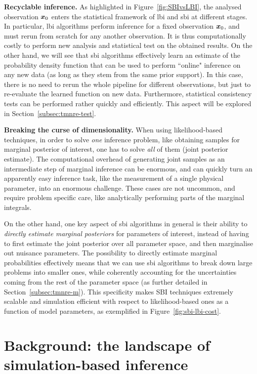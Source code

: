 \noindent \textbf{Recyclable inference.} As highlighted in Figure~\ref{fig:SBIvsLBI}, the analysed observation $\bm{x}_0$ enters the statistical framework of \gls*{lbi} and \gls*{sbi} at different stages. In particular, \gls*{lbi} algorithms perform inference for a fixed observation $\bm{x}_0$, and must rerun from scratch for any another observation. It is thus computationally costly to perform new analysis and statistical test on the obtained results. On the other hand, we will see that \gls*{sbi} algorithms effectively learn an estimate of the probability density function that can be used to perform ``online" inference on any new data (as long as they stem from the same prior support). In this case, there is no need to rerun the whole pipeline for different observations, but just to re-evaluate the learned function on new data. Furthermore, statistical consistency tests can be performed rather quickly and efficiently. This aspect will be explored in Section~\ref{subsec:tmnre-test}.

\noindent \textbf{Breaking the curse of dimensionality.} When using likelihood-based techniques, in order to solve \emph{one} inference problem, like obtaining samples for marginal posterior of interest, one has to solve \emph{all} of them (joint posterior estimate). The computational overhead of generating joint samples as an intermediate step of marginal inference can be enormous, and can quickly turn an apparently easy inference task, like the measurement of a single physical parameter, into an enormous challenge. These cases are not uncommon, and require problem specific care, like analytically performing parts of the marginal integrals.

On the other hand, one key aspect of \gls*{sbi} algorithms in general is their ability to \emph{directly estimate marginal posteriors} for parameters of interest, instead of having to first estimate the joint posterior over all parameter space, and then marginalise out nuisance parameters. The possibility to directly estimate marginal probabilities effectively means that we can use \gls*{sbi} algorithms to break down large problems into smaller ones, while coherently accounting for the uncertainties coming from the rest of the parameter space (as further detailed in Section~\ref{subsec:tmnre-m}). This specificity makes SBI techniques extremely scalable and simulation efficient with respect to likelihood-based ones as a function of model parameters, as exemplified in Figure~\ref{fig:sbi-lbi-cost}. 

\section{Background: the landscape of simulation-based inference} \label{sec:sbi}

